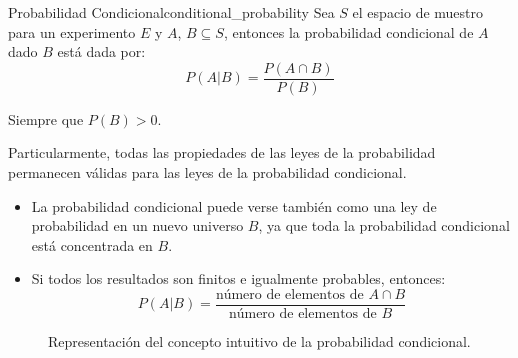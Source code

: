 \begin{theorem}{Probabilidad Condicional}{conditional_probability}
Sea $S$ el espacio de muestro para un experimento $E$ y $A$, $B \subseteq S$,
entonces la probabilidad condicional de $A$ dado $B$ está dada por:
    \begin{equation}
        P(A|B) = \frac{P(A \cap B)}{P(B)}
        \label{eq:conditionalProbability}
    \end{equation}

Siempre que $P(B)>0$.

Particularmente, todas las propiedades de las leyes de la probabilidad
permanecen válidas para las leyes de la probabilidad condicional.

\begin{itemize}
    \item La probabilidad condicional puede verse también como una ley de
    probabilidad en un nuevo universo $B$, ya que toda la probabilidad condicional
    está concentrada en $B$.

    \item Si todos los resultados son finitos e igualmente probables, entonces:
        \begin{equation}
            P(A|B)=\frac{\text{número de elementos de }A \cap B}{\text{número de elementos de }B}
        \end{equation}
\end{itemize}


\end{theorem}

\def\firstcircle{(0,0) circle (1.5cm)}
\def\secondcircle{(0:2cm) circle (1.5cm)}
\def\rectangle{(-2,-2) rectangle (4,2)}



\setlength{\parskip}{5mm}

\begin{figure}[h]
    \centering
    \caption{Representación del concepto intuitivo de la probabilidad condicional.}
    \label{fig:coditionalProbability}
\end{figure}

